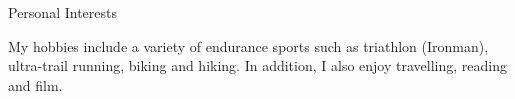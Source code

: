 \documentclass{resume} %
\begin{document}
\begin{rSection}{Personal Interests}

My hobbies include a variety of endurance sports such as triathlon (Ironman), ultra-trail running, biking and hiking.
In addition, I also enjoy travelling, reading and film.

\end{rSection}






\newpage

\newpage

\end{document}
